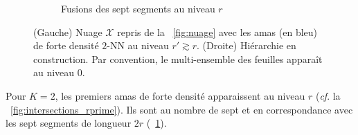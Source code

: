 \begin{figure}[htbp]
\begin{subfigure}[b]{0.53\textwidth}
        \caption{Fusions des sept segments au niveau $r$}
        \label{fig:foret_dendrogrammes}
    \end{subfigure}
    
    \caption{(Gauche) Nuage $\mathcal X$ repris de la \Fig~\ref{fig:nuage} avec les amas (en bleu) de forte densité $2$-NN au niveau $r' \gtrsim r$. (Droite) Hiérarchie en construction. Par convention, le multi-ensemble des feuilles apparaît au niveau $0$.}
    \label{fig:complexe_rprime}
\end{figure}


Pour $K=2$, les premiers amas de forte densité apparaissent au niveau $r$ (\emph{cf}. la \Fig~\ref{fig:intersections_rprime}). Ils sont au nombre de sept et en correspondance avec les sept segments de longueur $2r$ (\Fig~\ref{fig:foret_dendrogrammes}).


